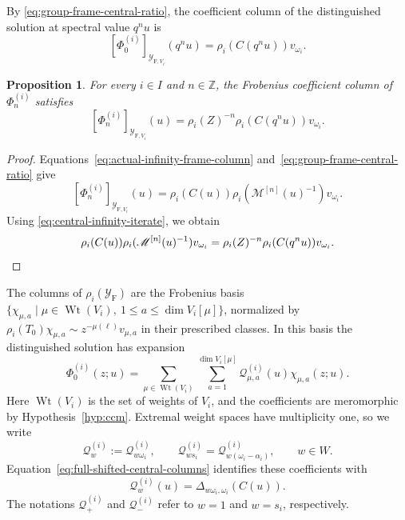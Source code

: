 \documentclass[11pt,leqno]{amsart}
\numberwithin{equation}{section}
\theoremstyle{plain}
\newtheorem{proposition}[theorem]{Proposition}
\theoremstyle{definition}
\theoremstyle{plain}
\theoremstyle{definition}
\theoremstyle{remark}
\begin{document}
By \eqref{eq:group-frame-central-ratio}, the coefficient column of the distinguished solution at spectral value $q^nu$ is
\begin{equation}\label{eq:full-shifted-central-columns}
 [\Phi_0^{(i)}]_{\mathcal Y_{\mathrm F,V_i}}(q^nu)
 =\rho_i(C(q^nu))v_{\omega_i}.
\end{equation}
\begin{proposition}\label{prop:integral-shifted-columns}
For every $i\in I$ and $n\in\mathbb Z$, the Frobenius coefficient column of $\Phi_n^{(i)}$ satisfies
\begin{equation}\label{eq:fixed-fiber-shifted-column}
 [\Phi_n^{(i)}]_{\mathcal Y_{\mathrm F,V_i}}(u)
 =\rho_i(Z)^{-n}\rho_i(C(q^nu))v_{\omega_i}.
\end{equation}
\end{proposition}
\begin{proof}
Equations~\eqref{eq:actual-infinity-frame-column} and~\eqref{eq:group-frame-central-ratio} give
\[
 [\Phi_n^{(i)}]_{\mathcal Y_{\mathrm F,V_i}}(u)
 =\rho_i(C(u))\rho_i(\mathscr M^{[n]}(u)^{-1})v_{\omega_i}.
\]
Using \eqref{eq:central-infinity-iterate}, we obtain
\[
 \rho_i(C(u))\rho_i(\mathscr M^{[n]}(u)^{-1})v_{\omega_i}
 =\rho_i(Z)^{-n}\rho_i(C(q^nu))v_{\omega_i}.\qedhere
\]
\end{proof}

The columns of $\rho_i(\mathcal Y_{\mathrm F})$ are the Frobenius basis
$\{\chi_{\mu,a}\mid \mu\in\operatorname{Wt}(V_i),\ 1\le a\le\dim V_i[\mu]\}$,
normalized by $\rho_i(T_0)\chi_{\mu,a}\sim z^{-\mu(\ell)}v_{\mu,a}$ in their prescribed classes. In this basis the distinguished solution has expansion
\begin{equation}\label{eq:Q-expansion}
 \Phi_0^{(i)}(z;u)
 =\sum_{\mu\in\operatorname{Wt}(V_i)}
  \sum_{a=1}^{\dim V_i[\mu]}
  \mathcal Q_{\mu,a}^{(i)}(u)\chi_{\mu,a}(z;u).
\end{equation}
Here $\operatorname{Wt}(V_i)$ is the set of weights of $V_i$, and the coefficients are meromorphic by Hypothesis~\ref{hyp:ccm}.  Extremal weight spaces have multiplicity one, so we write
\begin{equation}\label{eq:central-minor-notation}
 \mathcal Q_w^{(i)}:=\mathcal Q_{w\omega_i}^{(i)},
 \qquad
 \mathcal Q_{ws_i}^{(i)}=\mathcal Q_{w(\omega_i-\alpha_i)}^{(i)},
 \qquad w\in W.
\end{equation}
Equation~\eqref{eq:full-shifted-central-columns} identifies these coefficients with
\begin{equation}\label{eq:C-minor-Q-u}
 \mathcal Q_w^{(i)}(u)=\Delta_{w\omega_i,\omega_i}(C(u)).
\end{equation}
The notations $\mathcal Q_+^{(i)}$ and $\mathcal Q_-^{(i)}$ refer to $w=1$ and $w=s_i$, respectively.
\end{document}
